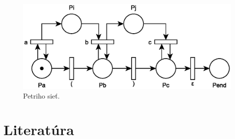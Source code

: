\documentclass[11pt,a4paper]{article}
\begin{document}
\begin{figure}[H]
  \centering
  \includegraphics[scale=1]{img/pn.eps}
  \caption{Petriho sieť.}
  \label{fig:pn}
\end{figure}

\newpage
\section{Literatúra}

\begin{flushleft}
    
\end{flushleft}
\end{document}

